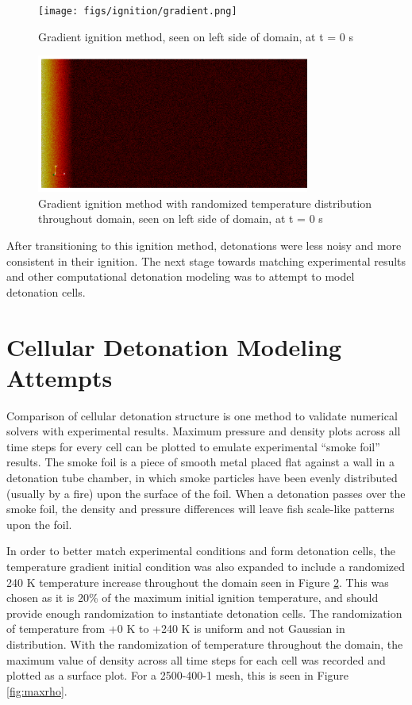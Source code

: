 \begin{figure}[t!]
\centering
\texttt{[image: figs/ignition/gradient.png]}
\caption{Gradient ignition method, seen on left side of domain, at t = 0 s}
\label{fig:gradig}
\end{figure}%

\begin{figure}[t!]
\centering
\includegraphics[width=0.8\textwidth]{figs/ignition/randgrad.png}
\caption{Gradient ignition method with randomized temperature distribution throughout domain, seen on left side of domain, at t = 0 s}
\label{fig:gradrand}
\end{figure}%

\noindent After transitioning to this ignition method, detonations were less noisy and more consistent in their ignition. The next stage towards matching experimental results and other computational detonation modeling was to attempt to model detonation cells. 

\section{Cellular Detonation Modeling Attempts}
Comparison of cellular detonation structure is one method to validate numerical solvers with experimental results. Maximum pressure and density plots across all time steps for every cell can be plotted to emulate experimental ``smoke foil'' results. The smoke foil is a piece of smooth metal placed flat against a wall in a detonation tube chamber, in which smoke particles have been evenly distributed (usually by a fire) upon the surface of the foil. When a detonation passes over the smoke foil, the density and pressure differences will leave fish scale-like patterns upon the foil. 

In order to better match experimental conditions and form detonation cells, the temperature gradient initial condition was also expanded to include a randomized 240 K temperature increase throughout the domain seen in Figure \ref{fig:gradrand}. This was chosen as it is 20\% of the maximum initial ignition temperature, and should provide enough randomization to instantiate detonation cells. The randomization of temperature from +0 K to +240 K is uniform and not Gaussian in distribution. With the randomization of temperature throughout the domain, the maximum value of density across all time steps for each cell was recorded and plotted as a surface plot. 
For a 2500-400-1 mesh, this is seen in Figure \ref{fig:maxrho}.

